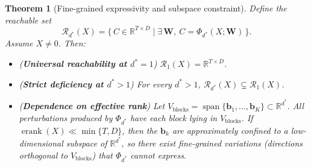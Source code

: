 \documentclass[10pt,a4paper]{amsart}
\newtheorem{theorem}{Theorem}
\begin{document}
\begin{theorem}[Fine-grained expressivity and subspace constraint]
\label{thm:expressivity}
Define the reachable set
\[
\mathcal R_{d^{\ast}}(X)
=\bigl\{\,C\in\mathbb R^{T\times D}\mid \exists\,\mathbf W,\ 
C=\Phi_{d^{\ast}}(X;\mathbf W)\,\bigr\}.
\]
Assume \(X\neq 0\). Then:
\begin{itemize}[leftmargin=15pt,parsep=2pt,itemsep=2pt,topsep=2pt]
  \item[(i)] (\textbf{Universal reachability at \(d^{\ast}=1\)}) \(\mathcal R_1(X)=\mathbb R^{T\times D}\).
  \item[(ii)] (\textbf{Strict deficiency at \(d^{\ast}>1\)}) For every \(d^{\ast}>1\), \(\mathcal R_{d^{\ast}}(X)\subsetneq\mathcal R_1(X)\).
  \item[(iii)] (\textbf{Dependence on effective rank}) Let \(V_{\mathrm{blocks}}=\operatorname{span}\{\mathbf b_1,\dots,\mathbf b_K\}\subset\mathbb R^{d^{\ast}}\). All perturbations produced by \(\Phi_{d^{\ast}}\) have each block lying in \(V_{\mathrm{blocks}}\). If \(\operatorname{erank}(X)\ll\min\{T,D\}\), then the \(\mathbf b_k\) are approximately confined to a low-dimensional subspace of \(\mathbb R^{d^{\ast}}\), so there exist fine-grained variations (directions orthogonal to \(V_{\mathrm{blocks}}\)) that \(\Phi_{d^{\ast}}\) cannot express.
\end{itemize}
\end{theorem}
\end{document}

